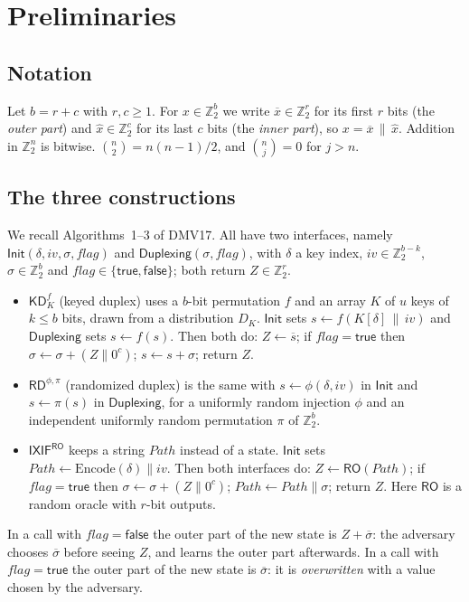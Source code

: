 \documentclass[11pt,a4paper]{article}
\theoremstyle{definition}
\theoremstyle{remark}
\newcommand{\KD}{\mathsf{KD}}
\newcommand{\RD}{\mathsf{RD}}
\newcommand{\IXIF}{\mathsf{IXIF}}
\newcommand{\RO}{\mathsf{RO}}
\newcommand{\Path}{\mathit{Path}}
\newcommand{\flag}{\mathit{flag}}
\newcommand{\true}{\mathsf{true}}
\newcommand{\false}{\mathsf{false}}
\newcommand{\Z}{\mathbb{Z}}
\newcommand{\outp}[1]{\overline{#1}}
\newcommand{\inp}[1]{\widehat{#1}}
\begin{document}
\section{Preliminaries}\label{sec:prelim}

\subsection{Notation}
Let $b = r + c$ with $r, c \ge 1$. For $x \in \Z_2^b$ we write $\outp{x} \in \Z_2^r$ for its first $r$ bits (the
\emph{outer part}) and $\inp{x} \in \Z_2^c$ for its last $c$ bits (the \emph{inner part}), so $x = \outp{x} \,\|\, \inp{x}$.
Addition in $\Z_2^n$ is bitwise. $\binom{n}{2} = n(n-1)/2$, and $\binom{n}{j} = 0$ for $j > n$.

\subsection{The three constructions}
We recall Algorithms~1--3 of DMV17. All have two interfaces, namely $\mathsf{Init}(\delta, iv, \sigma, \flag)$ and
$\mathsf{Duplexing}(\sigma, \flag)$, with $\delta$ a key index, $iv \in \Z_2^{b-k}$, $\sigma \in \Z_2^b$ and
$\flag \in \{\true, \false\}$; both return $Z \in \Z_2^r$.
\begin{itemize}[leftmargin=*,itemsep=2pt]
\item $\KD^f_K$ (keyed duplex) uses a $b$-bit permutation $f$ and an array $K$ of $u$ keys of $k \le b$ bits, drawn
from a distribution $D_K$. $\mathsf{Init}$ sets $s \leftarrow f(K[\delta] \,\|\, iv)$ and $\mathsf{Duplexing}$ sets
$s \leftarrow f(s)$. Then both do: $Z \leftarrow \outp{s}$; if $\flag = \true$ then $\sigma \leftarrow \sigma + (Z \| 0^c)$;
$s \leftarrow s + \sigma$; return $Z$.
\item $\RD^{\phi,\pi}$ (randomized duplex) is the same with $s \leftarrow \phi(\delta, iv)$ in $\mathsf{Init}$ and
$s \leftarrow \pi(s)$ in $\mathsf{Duplexing}$, for a uniformly random injection $\phi$ and an independent uniformly
random permutation $\pi$ of $\Z_2^b$.
\item $\IXIF^{\RO}$ keeps a string $\Path$ instead of a state. $\mathsf{Init}$ sets
$\Path \leftarrow \mathrm{Encode}(\delta) \| iv$. Then both interfaces do: $Z \leftarrow \RO(\Path)$; if $\flag = \true$
then $\sigma \leftarrow \sigma + (Z \| 0^c)$; $\Path \leftarrow \Path \| \sigma$; return $Z$. Here $\RO$ is a random oracle
with $r$-bit outputs.
\end{itemize}
In a call with $\flag = \false$ the outer part of the new state is $Z + \outp{\sigma}$: the adversary chooses
$\outp{\sigma}$ before seeing $Z$, and learns the outer part afterwards. In a call with $\flag = \true$ the outer part of
the new state is $\outp{\sigma}$: it is \emph{overwritten} with a value chosen by the adversary.
\end{document}
